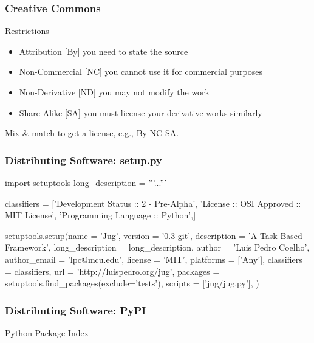 \begin{frame}[fragile]
\frametitle{Creative Commons}

\begin{block}{Restrictions}
\begin{itemize}
\item \alert{Attribution} [By] you need to state the source
\item \alert{Non-Commercial} [NC] you cannot use it for commercial purposes
\item \alert{Non-Derivative} [ND] you may not modify the work
\item \alert{Share-Alike} [SA] you must license your derivative works similarly 
\end{itemize}
\end{block}

Mix \& match to get a license, e.g., By-NC-SA.
\end{frame}

\begin{frame}[fragile]
\frametitle{Distributing Software: setup.py}
\begin{python}
import setuptools
long_description = '''...'''

classifiers = ['Development Status :: 2 - Pre-Alpha',
'License :: OSI Approved :: MIT License',
'Programming Language :: Python',]

setuptools.setup(name = 'Jug', version = '0.3-git',
      description = 'A Task Based Framework',
      long_description = long_description,
      author = 'Luis Pedro Coelho',
      author_email = 'lpc@mcu.edu',
      license = 'MIT', platforms = ['Any'],
      classifiers = classifiers,
      url = 'http://luispedro.org/jug',
      packages = setuptools.find_packages(exclude='tests'),
      scripts = ['jug/jug.py'],
      )

\end{python}
\end{frame}

\begin{frame}[fragile]
\frametitle{Distributing Software: PyPI}

Python Package Index

\end{frame}


